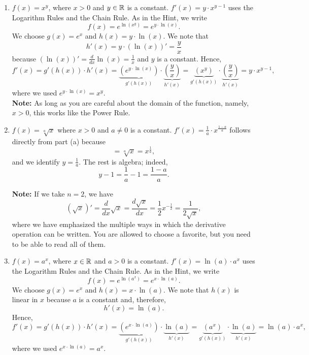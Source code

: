  \begin{enumerate}
   \renewcommand{\labelenumi}{(\alph{enumi})}
    \setlength{\itemsep}{.2cm}

    \item  $f(x) = x^y$, where $x>0$ and $y\in \mathbb R$ is a constant. \Ans $f'(x) = y \cdot x^{y-1}$ uses the Logarithm Rules and the Chain Rule. As in the Hint, we write
    $$ f(x) = e^{\ln(x^y)} = e^{y \cdot \ln(x)}.$$
    We choose $g(x) = e^x$ and $h(x) = y \cdot \ln(x)$. We note that $$ h'(x) = y \cdot \left(\ln(x) \right)' = \frac{y}{x}$$
    because $\left(\ln(x) \right)' = \frac{d}{dx} \ln(x) = \frac{1}{x}$ and $y$ is a constant.     
    Hence, 
     $$f'(x) = g'(h(x)) \cdot h'(x) = \underbrace{\left(e^{y \cdot \ln(x)} \right)}_{g'(h(x))} \cdot \underbrace{\left(\frac{y}{x}\right)}_{h'(x)} = \underbrace{\left( x^y\right)}_{g'(h(x))} \cdot \underbrace{\left(\frac{y}{x}\right)}_{h'(x)} = y \cdot x^{y-1},$$
     where we used $e^{y \cdot \ln(x)} = x^y.$\\

     \textbf{Note:} As long as you are careful about the domain of the function, namely, $x>0$, this works like the Power Rule.

      \item  $f(x) = \sqrt[a]{x}$ where $x>0$ and $a \neq 0$ is a constant. \Ans $f'(x) = \frac{1}{a} \cdot x^{\frac{1-a}{a}}$ follows directly from part (a) because 
      $$ = \sqrt[a]{x} = x^{\frac{1}{a}}, $$
      and we identify $y = \frac{1}{a}$. The rest is algebra; indeed, $$y-1 = \frac{1}{a}-1 =  \frac{1 - a}{a}.$$

      \textbf{Note:} If we take $n=2$, we have 
      $$\boxed{\left( \sqrt{x} \right)' = \frac{d }{dx} \sqrt{x} =  \frac{d \sqrt{x}}{dx}   = \frac{1}{2} x^{-\frac{1}{2}} = \frac{1}{2 \sqrt{x}},}$$ 
      where we have emphasized the multiple ways in which the derivative operation can be written. You are allowed to choose a favorite, but you need to be able to read all of them.

      \item $f(x) =a^x$, where $x\in \mathbb R$ and $a>0$ is a constant. \Ans $f'(x) = \ln(a) \cdot a^x$ uses the Logarithm Rules and the Chain Rule. As in the Hint, we write
    $$ f(x) = e^{\ln(a^x)} = e^{x \cdot \ln(a)}.$$
    We choose $g(x) = e^x$ and $h(x) = x \cdot \ln(a)$. We note that $h(x)$ is linear in $x$ because $a$ is a constant and, therefore, $$ h'(x) = \ln(a).$$
     Hence, 
     $$f'(x) = g'(h(x)) \cdot h'(x) = \underbrace{\left(e^{x \cdot \ln(a)} \right)}_{g'(h(x))} \cdot \underbrace{\ln(a)}_{h'(x)} = \underbrace{\left( a^x \right)}_{g'(h(x))} \cdot \underbrace{\ln(a)}_{h'(x)} = \ln(a) \cdot a^x,$$
     where we used $e^{x \cdot \ln(a)} = a^x.$\\


\end{enumerate}
